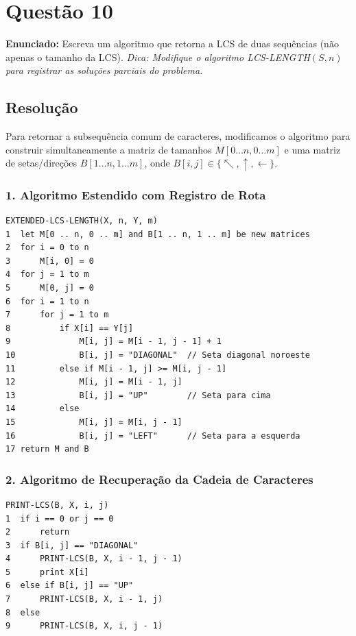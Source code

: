 \documentclass[11pt,a4paper]{article}
\begin{document}
\vspace{0.4cm}

\section*{Questão 10}
\textbf{Enunciado:} Escreva um algoritmo que retorna a LCS de duas sequências (não apenas o tamanho da LCS). \emph{Dica: Modifique o algoritmo \textsc{LCS-LENGTH}$(S, n)$ para registrar as soluções parciais do problema.}

\subsection*{Resolução}

Para retornar a subsequência comum de caracteres, modificamos o algoritmo para construir simultaneamente a matriz de tamanhos $M[0 \dots n, 0 \dots m]$ e uma matriz de setas/direções $B[1 \dots n, 1 \dots m]$, onde $B[i, j] \in \{\nwarrow, \uparrow, \leftarrow\}$.

\subsubsection*{1. Algoritmo Estendido com Registro de Rota}

\begin{lstlisting}
EXTENDED-LCS-LENGTH(X, n, Y, m)
1  let M[0 .. n, 0 .. m] and B[1 .. n, 1 .. m] be new matrices
2  for i = 0 to n
3      M[i, 0] = 0
4  for j = 1 to m
5      M[0, j] = 0
6  for i = 1 to n
7      for j = 1 to m
8          if X[i] == Y[j]
9              M[i, j] = M[i - 1, j - 1] + 1
10             B[i, j] = "DIAGONAL"  // Seta diagonal noroeste
11         else if M[i - 1, j] >= M[i, j - 1]
12             M[i, j] = M[i - 1, j]
13             B[i, j] = "UP"        // Seta para cima
14         else
15             M[i, j] = M[i, j - 1]
16             B[i, j] = "LEFT"      // Seta para a esquerda
17 return M and B
\end{lstlisting}

\subsubsection*{2. Algoritmo de Recuperação da Cadeia de Caracteres}

\begin{lstlisting}
PRINT-LCS(B, X, i, j)
1  if i == 0 or j == 0
2      return
3  if B[i, j] == "DIAGONAL"
4      PRINT-LCS(B, X, i - 1, j - 1)
5      print X[i]
6  else if B[i, j] == "UP"
7      PRINT-LCS(B, X, i - 1, j)
8  else
9      PRINT-LCS(B, X, i, j - 1)
\end{lstlisting}
\end{document}
